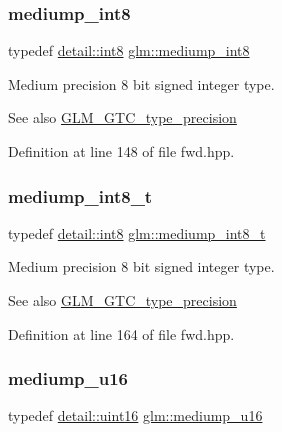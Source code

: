 \subsubsection{\texorpdfstring{mediump\_int8}{mediump\_int8}}
{\footnotesize\ttfamily typedef \mbox{\hyperlink{namespaceglm_1_1detail_a04b526a8d7a9b455602a0afa78c531e0}{detail\+::int8}} \mbox{\hyperlink{group__gtc__type__precision_ga3ee8faab2278c44c5785af04b7b18a14}{glm\+::mediump\+\_\+int8}}}

Medium precision 8 bit signed integer type. \begin{DoxySeeAlso}{See also}
\mbox{\hyperlink{group__gtc__type__precision}{G\+L\+M\+\_\+\+G\+T\+C\+\_\+type\+\_\+precision}} 
\end{DoxySeeAlso}


Definition at line 148 of file fwd.\+hpp.

\mbox{\label{group__gtc__type__precision_ga626ac5f73d3538e62a879d6c56abfb36}} 
\subsubsection{\texorpdfstring{mediump\_int8\_t}{mediump\_int8\_t}}
{\footnotesize\ttfamily typedef \mbox{\hyperlink{namespaceglm_1_1detail_a04b526a8d7a9b455602a0afa78c531e0}{detail\+::int8}} \mbox{\hyperlink{group__gtc__type__precision_ga626ac5f73d3538e62a879d6c56abfb36}{glm\+::mediump\+\_\+int8\+\_\+t}}}

Medium precision 8 bit signed integer type. \begin{DoxySeeAlso}{See also}
\mbox{\hyperlink{group__gtc__type__precision}{G\+L\+M\+\_\+\+G\+T\+C\+\_\+type\+\_\+precision}} 
\end{DoxySeeAlso}


Definition at line 164 of file fwd.\+hpp.

\mbox{\label{group__gtc__type__precision_ga6745262ef6a6fdb8637b2387ef924828}} 
\subsubsection{\texorpdfstring{mediump\_u16}{mediump\_u16}}
{\footnotesize\ttfamily typedef \mbox{\hyperlink{namespaceglm_1_1detail_a47b2a7d006d187338e8031a352d1ce56}{detail\+::uint16}} \mbox{\hyperlink{group__gtc__type__precision_ga6745262ef6a6fdb8637b2387ef924828}{glm\+::mediump\+\_\+u16}}}


